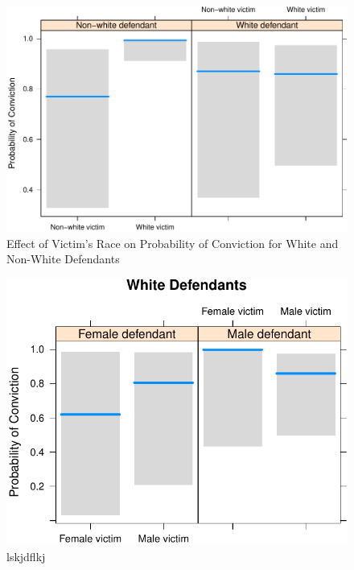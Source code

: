 \documentclass[12pt,article]{article}
\begin{document}
\begin{figure}[htbp]
\centering
\includegraphics{stand_your_ground_article_files/figure-latex/unnamed-chunk-3.pdf}
\caption{Effect of Victim's Race on Probability of Conviction for White
and Non-White Defendants}
\end{figure}

\begin{figure}[htbp]
\centering
\includegraphics{stand_your_ground_article_files/figure-latex/unnamed-chunk-4.pdf}
\caption{lskjdflkj}
\end{figure}
\end{document}
